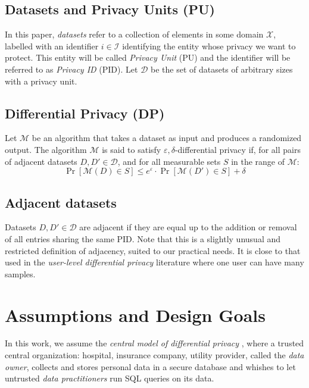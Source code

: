 \documentclass[letterpaper]{article} %
\begin{document}
\subsection*{Datasets and Privacy Units (PU)}

In this paper, \emph{datasets} refer to a collection of elements in some domain $\mathcal{X}$, labelled with an identifier $i\in \mathcal{I}$ identifying the entity whose privacy we want to protect. This entity will be called \emph{Privacy Unit} (PU) and the identifier will be referred to as \emph{Privacy ID} (PID). Let $\mathcal{D}$ be the set of datasets of arbitrary sizes with a privacy unit.

\subsection*{Differential Privacy (DP)}

Let $\mathcal{M}$ be an algorithm that takes a dataset as input and produces a randomized output. The algorithm $\mathcal{M}$ is said to satisfy $\varepsilon,\delta$-differential privacy if, for all pairs of adjacent datasets $D, D' \in \mathcal{D}$, and for all measurable sets $S$ in the range of $\mathcal{M}$:
$$\Pr[\mathcal{M}(D) \in S] \leq e^{\varepsilon} \cdot \Pr[\mathcal{M}(D') \in S] + \delta$$

\subsection*{Adjacent datasets}

Datasets $D, D' \in \mathcal{D}$ are adjacent if they are equal up to the addition or removal of all entries sharing the same PID. Note that this is a slightly unusual and restricted definition of adjacency, suited to our practical needs. It is close to that used in the \emph{user-level differential privacy} literature \cite{liu2020learning, wilson2019differentially} where one user can have many samples.

\section{Assumptions and Design Goals}

In this work, we assume the \emph{central model of differential privacy} \cite{near2020threat}, where a trusted central organization: hospital, insurance company, utility provider, called the \emph{data owner}, collects and stores personal data in a secure database and whishes to let untrusted \emph{data practitioners} run SQL queries on its data.
\end{document}
